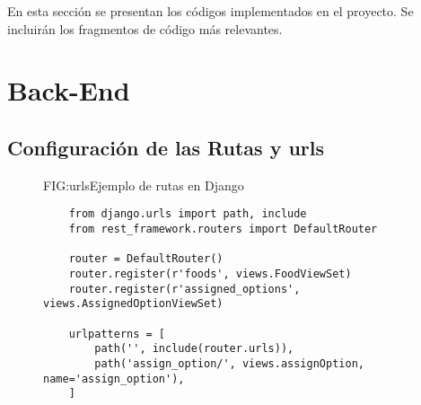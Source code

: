 En esta sección se presentan los códigos implementados en el proyecto. Se incluirán los fragmentos de código más relevantes.

\section{Back-End}
\subsection{Configuración de las Rutas y urls}
\begin{figure}[Ejemplo Código Urls]{FIG:urls}{Ejemplo de rutas en Django}
    \begin{verbatim}
    from django.urls import path, include
    from rest_framework.routers import DefaultRouter
    
    router = DefaultRouter()
    router.register(r'foods', views.FoodViewSet)
    router.register(r'assigned_options', views.AssignedOptionViewSet)
    
    urlpatterns = [
        path('', include(router.urls)),
        path('assign_option/', views.assignOption, name='assign_option'),
    ]
    \end{verbatim}
    \end{figure}


